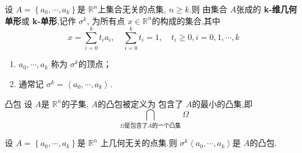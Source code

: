 \documentclass[../../几何与拓扑.tex]{subfiles}
\begin{document}
\begin{definition}
    设 \(  A =  \left\{  a_0,\cdots,a_{k}    \right\}  \)是 \(  \mathbb{R} ^{n}  \)上集合无关的点集, \(  n \ge k  \).则 由集合 \(  A  \)张成的 \textbf{k-维几何单形}或 \textbf{k-单形},记作 \(   \sigma ^{k}  \),
    为所有点 \(  x \in \mathbb{R} ^{n}  \)的构成的集合,其中 \[
    x =  \sum _{i= 0}^{k} t_{i}a_{i},\quad \sum_{i= 0}^{k} t_{i}= 1, \quad  t_{i}\ge 0,i= 0, 1,\cdots,k 
    \]      
\end{definition}

\begin{remark}
    \begin{enumerate}
        \item  \(   a_0,\cdots,a_{k}     \) 称为 \(   \sigma ^{k}  \)的顶点；
        \item 通常记 \(   \sigma ^{k} =  \left< a_0,\cdots,a_{k}    \right>  \).  
    \end{enumerate}
    
\end{remark}

\begin{definition}{凸包}
    设 \(  A  \)是 \(  \mathbb{R} ^{n}  \)的子集, \(  A  \)的凸包被定义为 包含了 \(  A  \)的最小的凸集,即 \[
    \bigcap_{ \Omega \text{是包含了}A\text{的一个凸集}} \Omega  
    \]    
\end{definition}
\hspace*{\fill} 

\begin{proposition}
    设 \(  A =  \left\{  a_0,\cdots,a_{k}    \right\}  \)是 \(  \mathbb{R} ^{n}  \)  上几何无关的点集.则 \(   \sigma ^{k} \left< a_0,\cdots,a_{k}    \right>  \)是 \(  A  \)的凸包.  
\end{proposition}
\end{document}
